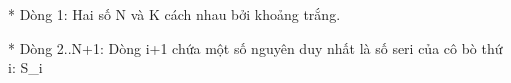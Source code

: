 * Dòng 1: Hai số N và K cách nhau bởi khoảng trắng.  

   * Dòng 2..N+1: Dòng i+1 chứa một số nguyên duy nhất là số seri của cô bò thứ i: S\_i